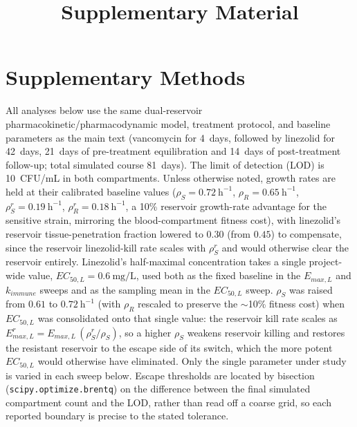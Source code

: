 \documentclass[11pt]{article}
\title{Supplementary Material}
\author{}
\date{}
\begin{document}
\maketitle

\setcounter{page}{1}
\renewcommand{\thepage}{S\arabic{page}}

\section*{Supplementary Methods}

All analyses below use the same dual-reservoir pharmacokinetic/pharmacodynamic
model, treatment protocol, and baseline parameters as the main text
(vancomycin for 4~days, followed by linezolid for
42~days, 21~days of pre-treatment equilibration and 14~days of post-treatment
follow-up; total simulated course 81~days). The limit of detection (LOD) is
10~CFU/mL in both compartments. Unless otherwise noted, growth rates are held
at their calibrated baseline values ($\rho_S = 0.72~\mathrm{h}^{-1}$,
$\rho_R = 0.65~\mathrm{h}^{-1}$, $\rho_S^r = 0.19~\mathrm{h}^{-1}$,
$\rho_R^r = 0.18~\mathrm{h}^{-1}$, a 10\% reservoir growth-rate advantage
for the sensitive strain, mirroring the blood-compartment fitness cost), with
linezolid's reservoir tissue-penetration fraction lowered to
$0.30$ (from $0.45$) to compensate, since the reservoir linezolid-kill rate
scales with $\rho_S^r$ and would otherwise clear the reservoir entirely.
Linezolid's half-maximal concentration takes a single project-wide value,
$EC_{50,L} = 0.6~\mathrm{mg/L}$, used both as the fixed baseline in the
$E_{max,L}$ and $k_{immune}$ sweeps and as the sampling mean in the
$EC_{50,L}$ sweep. $\rho_S$ was raised from $0.61$ to
$0.72~\mathrm{h}^{-1}$ (with $\rho_R$ rescaled to preserve the $\sim$10\%
fitness cost) when $EC_{50,L}$ was consolidated onto that single value:
the reservoir kill rate scales as
$E_{max,L}^{r} = E_{max,L}\,(\rho_S^r/\rho_S)$, so a higher $\rho_S$
weakens reservoir killing and restores the resistant reservoir to the
escape side of its switch, which the more potent $EC_{50,L}$ would
otherwise have eliminated.
Only the single parameter under study is varied in each sweep below. Escape
thresholds are located by bisection
(\texttt{scipy.optimize.brentq}) on the difference between the final
simulated compartment count and the LOD, rather than read off a coarse grid,
so each reported boundary is precise to the stated tolerance.



\end{document}
